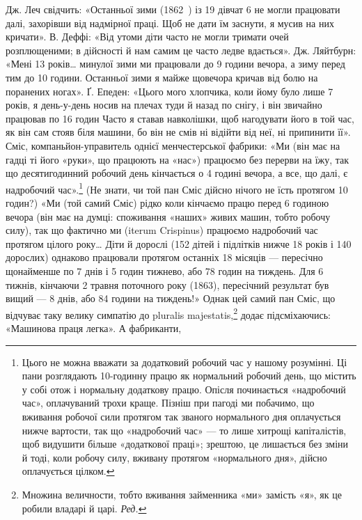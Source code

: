 Дж. Леч свідчить: «Останньої зими (1862~) із 19 дівчат 6
не могли працювати далі, захорівши від надмірної праці. Щоб не
дати їм заснути, я мусив на них кричати». В. Деффі: «Від утоми
діти часто не могли тримати очей розплющеними; в дійсності й
нам самим це часто ледве вдається». Дж. Ляйтбурн: «Мені
13 років\dots{} минулої зими ми працювали до 9 години вечора, а
зиму перед тим до 10 години. Останньої зими я майже щовечора
кричав від болю на поранених ногах». Ґ. Епеден: «Цього мого
хлопчика, коли йому було лише 7 років, я день-у-день носив
на плечах туди й назад по снігу, і він звичайно працював по
16 годин Часто я ставав навколішки, щоб нагодувати його в той
час, як він сам стояв біля машини, бо він не смів ні відійти від
неї, ні припинити її». Сміс, компаньйон-управитель однієї
менчестерської фабрики: «Ми (він має на гадці ті його «руки»,
що працюють на «нас») працюємо без перерви на їжу, так що
десятигодинний робочий день кінчається о 4  годині вечора, а
все, що далі, є надробочий час».\footnote{
Цього не можна вважати за додатковий робочий час у нашому розумінні.
Ці пани розглядають 10-годинну працю як нормальний
робочий день, що містить у собі отож і нормальну додаткову працю. Опісля
починається «надробочий час», оплачуваний трохи краще. Пізніш при
пагоді ми побачимо, що вживання робочої сили протягом так званого
нормального дня оплачується нижче вартости, так що «надробочий
час» — то лише хитрощі капіталістів, щоб видушити більше «додаткової
праці»; зрештою, це лишається без зміни й тоді, коли робочу силу, вживану
протягом «нормального дня», дійсно оплачується цілком.
} (Не знати, чи той пан Сміс
дійсно нічого не їсть протягом  10 годин?) «Ми (той самий
Сміс) рідко коли кінчаємо працю перед 6 годиною вечора (він
має на думці: споживання «наших» живих машин, тобто робочу
силу), так що фактично ми (iterum Crispinus) працюємо надробочий
час протягом цілого року\dots{} Діти й дорослі (152 дітей і
підлітків нижче 18 років і 140 дорослих) однаково працювали
протягом останніх 18 місяців — пересічно щонайменше по 7 днів
і 5 годин тижнево, або 78 годин на тиждень. Для 6 тижнів,
кінчаючи 2 травня поточного року (1863), пересічний результат
був вищий — 8 днів, або 84 години на тиждень!» Однак  цей самий
пан Сміс, що відчуває таку велику симпатію до pluralis majestatis,\footnote*{
Множина величности, тобто вживання займенника «ми» замість
«я», як це робили владарі й царі. \emph{Ред.}
}
додає підсміхаючись: «Машинова праця легка». А фабриканти,
